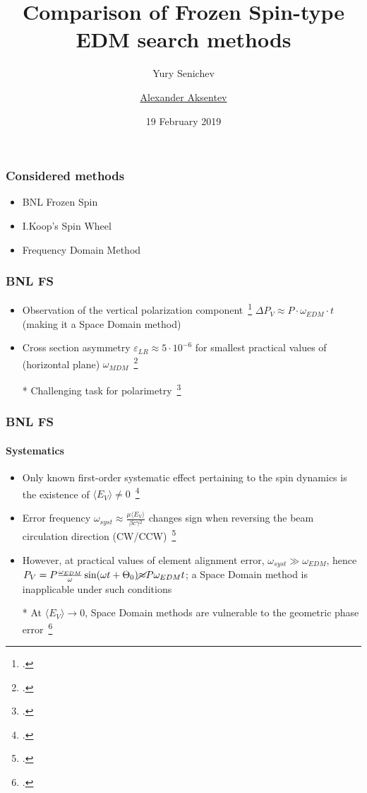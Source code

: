 \documentclass{beamer}
\title{Comparison of Frozen Spin-type EDM search methods}
\author[shortname]{Yury Senichev \inst{1} \and \underline{Alexander Aksentev} \inst{2,3}}
\institute[shortinst]{\inst{1} Institute for Nuclear Research of RAS \and%
  \inst{2} Forschungszentrum J\"ulich \and%
  \inst{3} NRNU ``MEPhI''
}
\date{19 February 2019}
\newcommand{\w}{\omega}
\newcommand{\avg}[1]{\langle{#1}\rangle}
\begin{document}
\begin{frame}
  \titlepage
\end{frame}

\begin{frame}\frametitle{Considered methods}
  \begin{itemize}
  \item BNL Frozen Spin
  \item I.Koop's Spin Wheel
  \item Frequency Domain Method
  \end{itemize}
\end{frame}

\begin{frame}\frametitle{BNL FS}
  \begin{itemize}
  \item Observation of the vertical polarization component~\footcite[p.~9]{BNL:Deuteron2008}
    $\Delta P_V \approx P\cdot\w_{EDM}\cdot t$ (making it a Space Domain method)
  \item Cross section asymmetry $\varepsilon_{LR}\approx 5\cdot 10^{-6}$ for
    smallest practical values of (horizontal plane) $\w_{MDM}$~\footcite[p.~18]{BNL:Deuteron2008}
  \item[*] Challenging task for polarimetry~\footcite[p.~6]{Mane:SpinWheel}
  \end{itemize}
\end{frame}

\begin{frame}\frametitle{BNL FS}\framesubtitle{Systematics}
  \begin{itemize}
  \item Only known first-order systematic effect pertaining to the spin dynamics is the existence of
    $\avg{E_V}\neq 0$~\footcite[p.~10]{BNL:Deuteron2008}
  \item Error frequency $\w_{syst} \approx \frac{\mu\avg{E_V}}{\beta c\gamma^2}$ changes sign when reversing
    the beam circulation direction (CW/CCW)~\footcite[p.~11]{BNL:Deuteron2008}
  \item However, at practical values of element alignment error, $\w_{syst} \gg \w_{EDM}$, hence
    $P_V = P\frac{\w_{EDM}}{\w}\sin(\w t + \Theta_0) \cancel{\approx}P\w_{EDM} t$;
    a Space Domain method is inapplicable under such conditions
  \item[*] At $\avg{E_V}\rightarrow 0$, Space Domain methods are vulnerable to
    the geometric phase error~\footcite[p.~6]{BNL:Proton}
  \end{itemize}
\end{frame}
\end{document}
